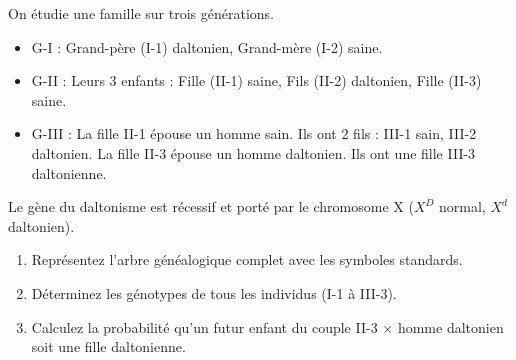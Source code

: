 \documentclass[11pt]{article}
\begin{document}
\begin{exercice}
On étudie une famille sur trois générations.
\begin{itemize}
\item G-I : Grand-père (I-1) daltonien, Grand-mère (I-2) saine.
\item G-II : Leurs 3 enfants : Fille (II-1) saine, Fils (II-2) daltonien, Fille (II-3) saine.
\item G-III : La fille II-1 épouse un homme sain. Ils ont 2 fils : III-1 sain, III-2 daltonien. La fille II-3 épouse un homme daltonien. Ils ont une fille III-3 daltonienne.
\end{itemize}
Le gène du daltonisme est récessif et porté par le chromosome X ($X^D$ normal, $X^d$ daltonien).
\begin{enumerate}
\item Représentez l'arbre généalogique complet avec les symboles standards.
\item Déterminez les génotypes de tous les individus (I-1 à III-3).
\item Calculez la probabilité qu'un futur enfant du couple II-3 $\times$ homme daltonien soit une fille daltonienne.
\end{enumerate}
\end{exercice}
\end{document}
